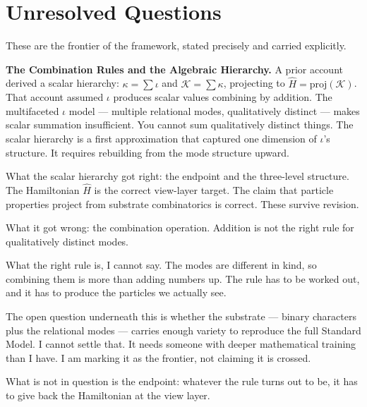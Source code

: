 \documentclass[11pt,letterpaper]{article}
\newcommand{\Kappa}{\mathcal{K}}
\begin{document}
\section{Unresolved Questions}
\label{sec:org08c0613}

These are the frontier of the framework, stated precisely and carried explicitly.

\textbf{The Combination Rules and the Algebraic Hierarchy.} A prior account derived a scalar hierarchy: \(\kappa = \sum \iota\) and \(\Kappa = \sum \kappa\), projecting to \(\hat{H} = \mathrm{proj}(\Kappa)\). That account assumed \(\iota\) produces scalar values combining by addition. The multifaceted \(\iota\) model — multiple relational modes, qualitatively distinct — makes scalar summation insufficient. You cannot sum qualitatively distinct things. The scalar hierarchy is a first approximation that captured one dimension of \(\iota\)'s structure. It requires rebuilding from the mode structure upward.

What the scalar hierarchy got right: the endpoint and the three-level structure. The Hamiltonian \(\hat{H}\) is the correct view-layer target. The claim that particle properties project from substrate combinatorics is correct. These survive revision.

What it got wrong: the combination operation. Addition is not the right rule for qualitatively distinct modes.

What the right rule is, I cannot say. The modes are different in kind, so combining them is more than adding numbers up. The rule has to be worked out, and it has to produce the particles we actually see.

The open question underneath this is whether the substrate --- binary characters plus the relational modes --- carries enough variety to reproduce the full Standard Model. I cannot settle that. It needs someone with deeper mathematical training than I have. I am marking it as the frontier, not claiming it is crossed.

What is not in question is the endpoint: whatever the rule turns out to be, it has to give back the Hamiltonian at the view layer.
\end{document}
